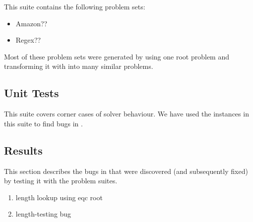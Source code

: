         This suite contains the following problem sets:

        \begin{itemize}
            \item Amazon??
            \item Regex??
        \end{itemize}

        Most of these problem sets were generated by using one root problem and transforming it with \transformer{} into many similar problems.

    \subsection{Unit Tests}

        This suite covers corner cases of solver behaviour. We have used the instances in this suite to find bugs in \us{}.

    \subsection{Results}

        This section describes the bugs in \us{} that were discovered (and subsequently fixed) by testing it with the \fuzzer{} problem suites.

        \begin{enumerate}
            \item length lookup using eqc root
            \item length-testing bug
        \end{enumerate}